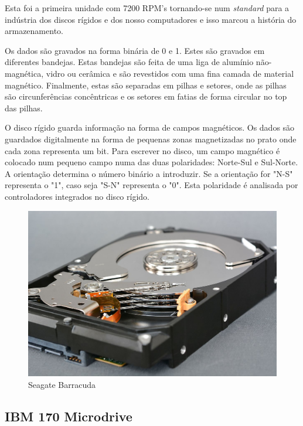 \documentclass{report}
\begin{document}
	Esta foi a primeira unidade com 7200 RPM's tornando-se num \textit{standard} para a indústria dos discos rígidos e dos nosso computadores e isso marcou a história do armazenamento.
\vspace{1mm}
	
	Os dados são gravados na forma binária de 0 e 1. Estes são gravados em diferentes bandejas. Estas bandejas são feita de uma liga de alumínio não-magnética, vidro ou cerâmica e são revestidos com uma fina camada de material magnético. Finalmente, estas são separadas em pilhas e setores, onde as pilhas são circunferências concêntricas e os setores em fatias de forma circular no top das pilhas.
\vspace{1mm}
	
	O disco rígido guarda informação na forma de campos magnéticos. Os dados são guardados digitalmente na forma de pequenas zonas magnetizadas no prato onde cada zona representa um bit. Para escrever no disco, um campo magnético é colocado num pequeno campo numa das duas polaridades: Norte-Sul e Sul-Norte. A orientação determina o número binário a introduzir. Se a orientação for "N-S" representa o "1", caso seja "S-N" representa o "0". Esta polaridade é analisada por controladores integrados no disco rígido.
\vspace{1mm}

	\begin{figure} [h]
		\centering
		\includegraphics[scale=0.7]{barracuda.jpg}
		\caption{Seagate Barracuda}
	\end{figure}
	
\newpage
	
		\subsection{IBM 170 Microdrive}
	
\end{document}
